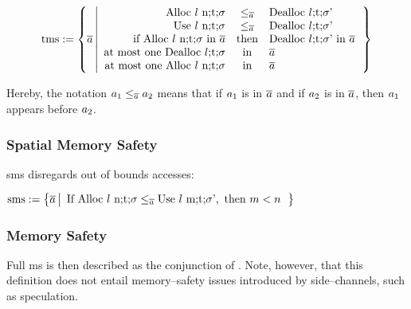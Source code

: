 \documentclass[utf8,acmsmall,review,screen,dvipsnames]{acmart}
\begin{document}
\begin{definition}\label{def:trace:tmsdef}
  $$
  \tmssafe:=\left\{\trace \left| \begin{array}{rcl}
                              \ev{Alloc\ \loc\ n;\sandboxtag;\securitytag}&\le_{\trace}&\ev{Dealloc\ \loc;\sandboxtag;\securitytag'} \\
                              \ev{Use\ \loc\ n;\sandboxtag;\securitytag}&\le_{\trace}&\ev{Dealloc\ \loc;\sandboxtag;\securitytag'} \\
                              \text{if }\ev{Alloc\ \loc\ n;\sandboxtag;\securitytag}\text{ in }\trace&\text{then}&\ev{Dealloc\ \loc;\sandboxtag;\securitytag'}\text{ in }\trace \\
                              \text{at most one }\ev{Dealloc\ \loc;\sandboxtag;\securitytag}&\text{in}&\trace \\
                              \text{at most one }\ev{Alloc\ \loc\ n;\sandboxtag;\securitytag}&\text{in}&\trace \\
                            \end{array}\right.\right\}
  $$
\end{definition}
Hereby, the notation $\event[_{1}]\le_{\trace}\event[_{2}]$ means that if $\event[_{1}]$ is in $\trace$ and if $\event[_{2}]$ is in $\trace$, then $\event[_{1}]$ appears before $\event[_{2}]$.

\subsubsection{Spatial Memory Safety}

\gls{sms} disregards out of bounds accesses:

\begin{definition}\label{def:trace:smsdef}
  $
  \smssafe:=\left\{\trace \left|\begin{array}{rcl}
                                  \text{If }\ev{Alloc\ \loc\ n;\sandboxtag;\securitytag}\le_{\trace}\ev{Use\ \loc\ m;\sandboxtag;\securitytag'}, \text{ then }m<n
                                \end{array}\right.\right\}
  $
\end{definition}

\subsubsection{Memory Safety}

Full \gls{ms} is then described as the conjunction of .
Note, however, that this definition does not entail memory--safety issues introduced by side--channels, such as speculation.
\end{document}
